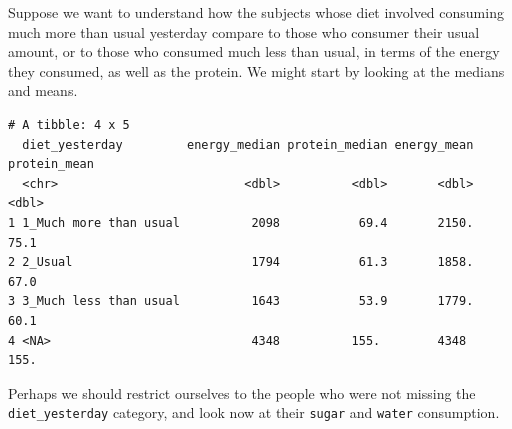 \documentclass[
]{book}
\newenvironment{Shaded}{\begin{snugshade}}{\end{snugshade}}
\newcommand{\DataTypeTok}[1]{\textcolor[rgb]{0.13,0.29,0.53}{#1}}
\newcommand{\KeywordTok}[1]{\textcolor[rgb]{0.13,0.29,0.53}{\textbf{#1}}}
\newcommand{\NormalTok}[1]{#1}
\newcommand{\OperatorTok}[1]{\textcolor[rgb]{0.81,0.36,0.00}{\textbf{#1}}}
\newcommand{\StringTok}[1]{\textcolor[rgb]{0.31,0.60,0.02}{#1}}
\begin{document}
Suppose we want to understand how the subjects whose diet involved consuming much more than usual yesterday compare to those who consumer their usual amount, or to those who consumed much less than usual, in terms of the energy they consumed, as well as the protein. We might start by looking at the medians and means.

\begin{Shaded}
\end{Shaded}

\begin{verbatim}
# A tibble: 4 x 5
  diet_yesterday         energy_median protein_median energy_mean protein_mean
  <chr>                          <dbl>          <dbl>       <dbl>        <dbl>
1 1_Much more than usual          2098           69.4       2150.         75.1
2 2_Usual                         1794           61.3       1858.         67.0
3 3_Much less than usual          1643           53.9       1779.         60.1
4 <NA>                            4348          155.        4348         155. 
\end{verbatim}

Perhaps we should restrict ourselves to the people who were not missing the \texttt{diet\_yesterday} category, and look now at their \texttt{sugar} and \texttt{water} consumption.

\begin{Shaded}
\end{Shaded}
\end{document}
